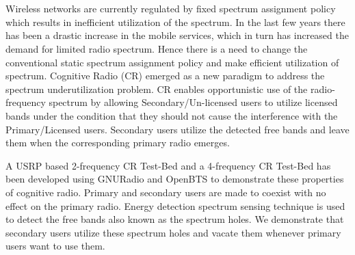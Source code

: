 \chapter*{}
Wireless networks are currently regulated by fixed spectrum assignment policy
which results in inefficient utilization of the spectrum. In the last few
years there has been a drastic increase in the mobile services, which in turn
has increased the demand for limited radio spectrum. Hence there is a need to
change the conventional static spectrum assignment policy and make efficient
utilization of spectrum. Cognitive Radio (CR) emerged as a new paradigm to
address the spectrum underutilization problem.  CR enables opportunistic use
of the radio-frequency spectrum by allowing Secondary/Un-licensed users to
utilize licensed bands under the condition that they should not cause the
interference with the Primary/Licensed users. Secondary users utilize the
detected free bands and leave them when the corresponding primary radio
emerges.

A USRP based 2-frequency CR Test-Bed and a 4-frequency CR Test-Bed has been
developed using GNURadio and OpenBTS to demonstrate these properties of
cognitive radio. Primary and secondary users are made to coexist with no
effect on the primary radio. Energy detection spectrum sensing technique is
used to detect the free bands also known as the spectrum holes. We demonstrate
that secondary users utilize these spectrum holes and vacate them whenever
primary users want to use them.
